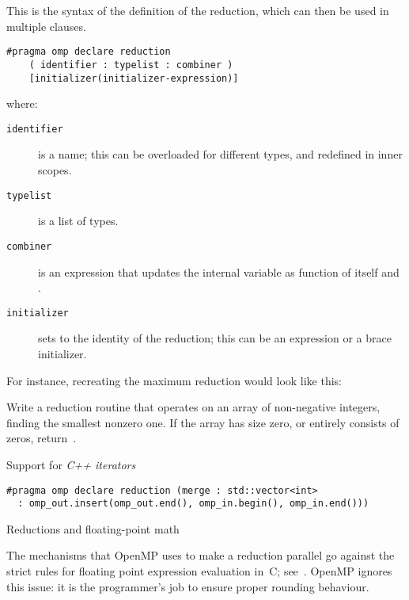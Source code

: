 This is the syntax of the definition of the reduction, which can then
be used in multiple  clauses.
\begin{lstlisting}
#pragma omp declare reduction 
    ( identifier : typelist : combiner )
    [initializer(initializer-expression)]
\end{lstlisting}
where:
\begin{description}
  \item[\texttt{identifier}] is a name; this can be overloaded for
    different types, and redefined in inner scopes.
  \item[\texttt{typelist}] is a list of types.
  \item[\texttt{combiner}] is an expression that updates the internal
    variable  as function of itself and .
  \item[\texttt{initializer}] sets  to the
    identity of the reduction; this
    can be an expression or a brace initializer.
\end{description}

For instance, recreating the maximum reduction would look like this:
%

\begin{exercise}
  Write a reduction routine that operates on an array of non-negative
  integers, finding the smallest nonzero one. If the array has size
  zero, or entirely consists of zeros, return~.
\end{exercise}

Support for
\emph{C++ iterators}
\begin{lstlisting}
#pragma omp declare reduction (merge : std::vector<int>
  : omp_out.insert(omp_out.end(), omp_in.begin(), omp_in.end())) 
\end{lstlisting}


 {Reductions and floating-point math}

The mechanisms that OpenMP uses to make a reduction parallel go
against the strict rules for floating point expression evaluation in~C;
see~. OpenMP ignores this issue: it is the
programmer's job to ensure proper rounding behaviour.

